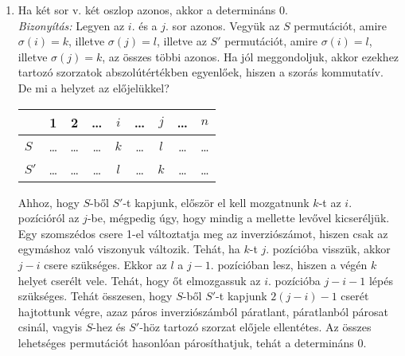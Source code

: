 \documentclass[a4paper,12pt,twoside]{book}
\theoremstyle{break}
\begin{document}
\begin{enumerate}
 \item Ha két sor v. két oszlop azonos, akkor a determináns 0.\vspace*{5pt}\\
 \textit{Bizonyítás:} Legyen az $i$. és a $j$. sor azonos. Vegyük az $S$ permutációt, amire $\sigma(i)=k$, illetve $\sigma(j)=l$, illetve az $S'$ permutációt, amire $\sigma(i)=l$, illetve $\sigma(j)=k$, az összes többi azonos. Ha jól meggondoljuk, akkor ezekhez tartozó szorzatok abszolútértékben egyenlőek, hiszen a szorás kommutatív. De mi a helyzet az előjelükkel?
{%
\begin{center}
\begin{tabular}{|l||c|c|c|c|c|c|c|c|}\hline
 & 1 & 2 & \ldots & $i$ & \ldots & $j$ & \ldots & $n$\\\hline\hline
$S$ & \ldots & \ldots & \ldots & $k$ & \ldots & $l$ & \ldots & \ldots\\\hline
$S'$ & \ldots & \ldots & \ldots & $l$ & \ldots & $k$ & \ldots & \ldots\\\hline
\end{tabular}
\end{center}
}%
Ahhoz, hogy $S$-ből $S'$-t kapjunk, először el kell mozgatnunk $k$-t az $i$. pozícióról az $j$-be, mégpedig úgy, hogy mindig a mellette levővel kicseréljük. Egy szomszédos csere 1-el változtatja meg az inverziószámot, hiszen csak az egymáshoz való viszonyuk változik. Tehát, ha $k$-t $j$. pozícióba visszük, akkor $j-i$ csere szükséges. Ekkor az $l$ a $j-1$. pozícióban lesz, hiszen a végén $k$ helyet cserélt vele. Tehát, hogy őt elmozgassuk az $i$. pozícióba $j-i-1$ lépés szükséges. Tehát összesen, hogy $S$-ből $S'$-t kapjunk $2(j-i)-1$ cserét hajtottunk végre, azaz páros inverziószámból páratlant, páratlanból párosat csinál, vagyis $S$-hez és $S'$-höz tartozó szorzat előjele ellentétes. Az összes lehetséges permutációt hasonlóan párosíthatjuk, tehát a determináns 0.


\end{enumerate}
\end{document}
